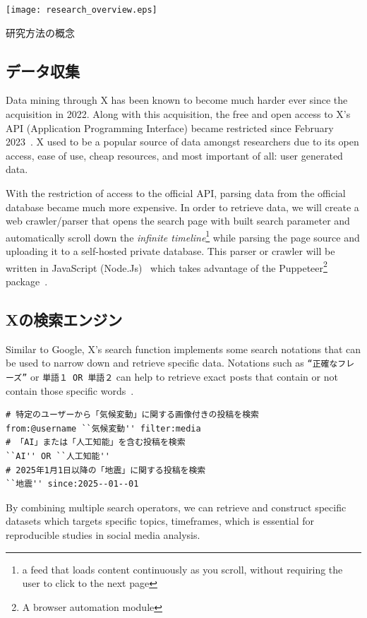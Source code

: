 \documentclass{jabstract}
\begin{document}
\begin{multicols}{2}
\begin{figurehere}
    \centering
    \texttt{[image: research\_overview.eps]}
    \caption{研究方法の概念}\label{fig:general-overview}
\end{figurehere}
\subsection{データ収集}
Data mining through X has been known to become much harder ever since the acquisition in 2022. Along with this acquisition, the free and open access to X's API (Application Programming Interface) became restricted since February 2023~\cite{twitter_api_free_access_2023}. X used to be a popular source of data amongst researchers due to its open access, ease of use, cheap resources, and most important of all: user generated data. 

With the restriction of access to the official API, parsing data from the official database became much more expensive. In order to retrieve data, we will create a web crawler/parser that opens the search page with built search parameter and automatically scroll down the \textit{infinite timeline}\footnote{a feed that loads content continuously as you scroll, without requiring the user to click to the next page} while parsing the page source and uploading it to a self-hosted private database. This parser or crawler will be written in JavaScript (Node.Js)~\cite{nodejs} which takes advantage of the Puppeteer\footnote{A browser automation module} package~\cite{puppeteer}. 

\subsection{Xの検索エンジン}\label{sec:x-search-enging}
Similar to Google, X's search function implements some search notations that can be used to narrow down and retrieve specific data. Notations such as \texttt{``正確なフレーズ''} or \texttt{単語１ OR 単語２} can help to retrieve exact posts that contain or not contain those specific words~\cite{twitter_search_operators}. 

\begin{verbatim}
# 特定のユーザーから「気候変動」に関する画像付きの投稿を検索
from:@username ``気候変動'' filter:media
# 「AI」または「人工知能」を含む投稿を検索
``AI'' OR ``人工知能''
# 2025年1月1日以降の「地震」に関する投稿を検索
``地震'' since:2025--01--01
\end{verbatim}

By combining multiple search operators, we can retrieve and construct specific datasets which targets specific topics, timeframes, which is essential for reproducible studies in social media analysis. 


\end{multicols}
\end{document}
